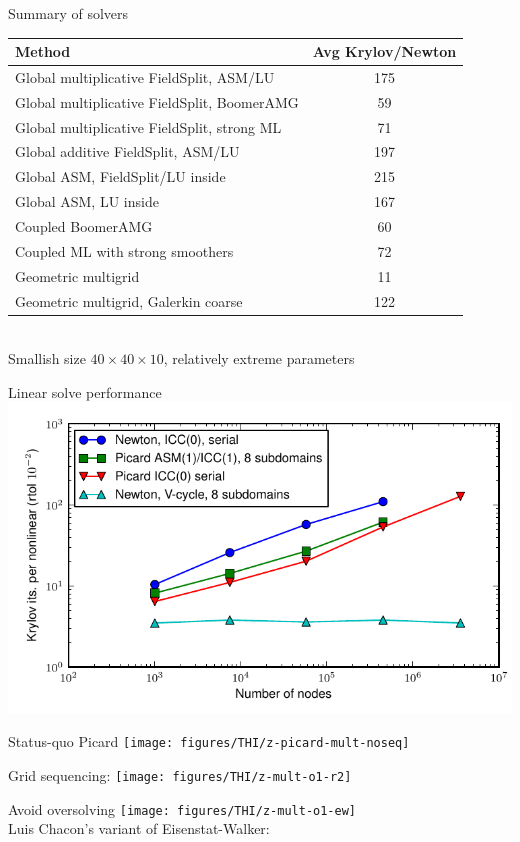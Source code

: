 \begin{frame}{Summary of solvers}
  \centering
  \begin{tabular}{|l|c|}
    \hline
    Method & Avg Krylov/Newton \\
    \hline
    Global multiplicative FieldSplit, ASM/LU & 175 \\
    Global multiplicative FieldSplit, BoomerAMG & 59 \\
    Global multiplicative FieldSplit, strong ML & 71 \\
    Global additive FieldSplit, ASM/LU & 197 \\
    Global ASM, FieldSplit/LU inside & 215 \\
    Global ASM, LU inside & 167 \\
    Coupled BoomerAMG & 60 \\
    Coupled ML with strong smoothers & 72 \\
    Geometric multigrid & 11 \\
    Geometric multigrid, Galerkin coarse & 122 \\
    \hline
  \end{tabular} \\
  {Smallish size $40\times 40\times 10$, relatively extreme parameters}
\end{frame}

\begin{frame}{Linear solve performance}
  \centering
  \includegraphics[width=\textwidth]{figures/THI/linear4}
\end{frame}

\begin{frame}{Status-quo Picard}
  \texttt{[image: figures/THI/z-picard-mult-noseq]}
\end{frame}

\begin{frame}{Grid sequencing: }
    \texttt{[image: figures/THI/z-mult-o1-r2]}
\end{frame}

\begin{frame}{Avoid oversolving}
    \texttt{[image: figures/THI/z-mult-o1-ew]} \\
    Luis Chacon's variant of Eisenstat-Walker: \\
\end{frame}
